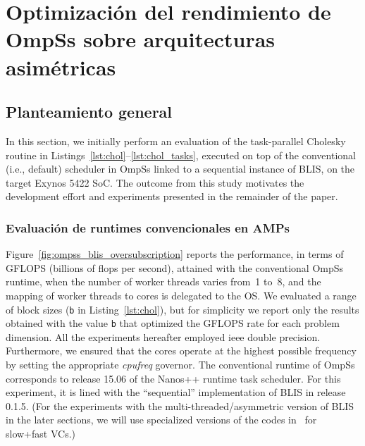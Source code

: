 \cleardoublepage

\chapter{Optimización del rendimiento de OmpSs sobre arquitecturas asimétricas}
\label{ch:chapter4}

%
%
%
%
\section{Planteamiento general}

In this section, we initially perform an evaluation 
of the task-parallel Cholesky routine in Listings~\ref{lst:chol}--\ref{lst:chol_tasks},
executed on top of the conventional (i.e., default) scheduler in 
OmpSs linked to a sequential instance of BLIS,  on the target Exynos 5422 SoC.  The outcome from this study 
motivates the development effort and experiments presented in the remainder of the paper.

\subsection{Evaluación de runtimes convencionales en AMPs}

Figure~\ref{fig:ompss_blis_oversubscription} reports the performance,
in terms of GFLOPS (billions of flops per second), attained with the conventional OmpSs runtime,
when the number of worker threads varies from~1 to~8, and the mapping of worker threads to cores is delegated to the OS. 
We evaluated a range of block sizes
({\tt b} in Listing~\ref{lst:chol}), but for simplicity we report only the results obtained with the value {\tt b} that optimized
the GFLOPS rate for each problem dimension.
All the experiments hereafter employed {\sc ieee} double precision. Furthermore,
we  ensured that the cores operate at the highest possible frequency by setting the appropriate {\em cpufreq} governor.
The conventional runtime of OmpSs corresponds to release 15.06 of the Nanos++ runtime task scheduler.
For this experiment, it is lined with the ``sequential'' implementation of BLIS in release 0.1.5.
(For the experiments with the multi-threaded/asymmetric version of BLIS in the later sections, 
we will use specialized versions of the codes in~\cite{asymBLIS} for slow+fast VCs.)

